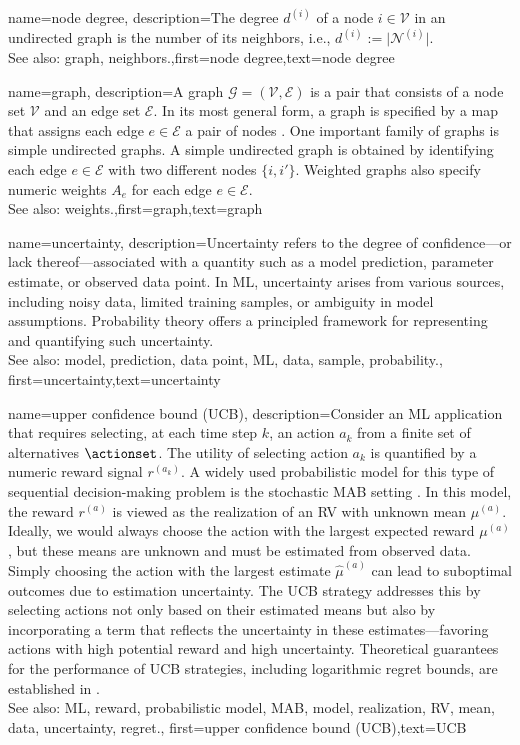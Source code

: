 {name={node degree},
	description={The degree $d^{(i)}$ of a node $i \in \mathcal{V}$ 
		in an undirected graph is the number of its neighbors, i.e., $d^{(i)} := \big|\mathcal{N}^{(i)}\big|$.
					\\ 
		See also: graph, neighbors.},first={node degree},text={node degree} 
}

{name={graph},
	description={A graph $\mathcal{G} = \left( \mathcal{V},\mathcal{E} \right)$ is a pair that consists of 
		a node set $\mathcal{V}$ and an edge set $\mathcal{E}$. In its most general form, a graph is 
		specified by a map that assigns each edge $e \in \mathcal{E}$ a pair of nodes \cite{RockNetworks}. 
		One important family of graphs is simple undirected graphs. A simple undirected graph 
		is obtained by identifying each edge $e \in \mathcal{E}$ with two different nodes $\{i,i'\}$. 
		Weighted graphs also specify numeric weights $A_{e}$ for each 
		edge $e \in \mathcal{E}$.
					\\ 
		See also: weights.},first={graph},text={graph} 
}

{name={uncertainty},
	description={Uncertainty refers to the degree of confidence—or 
		lack thereof—associated with a quantity such as a model prediction, parameter estimate, or 
		observed data point. In ML, uncertainty arises from various sources, including 
		noisy data, limited training samples, or ambiguity in model assumptions. Probability theory 
		offers a principled framework for representing and quantifying such uncertainty.
					\\ 
		See also: model, prediction, data point, ML, data, sample, probability.},
	first={uncertainty},text={uncertainty}
}

{name={upper confidence bound (UCB)},
	description={Consider an ML 
		application that requires selecting, at each time step $k$, an action $a_{k}$ 
		from a finite set of alternatives $\actionset$. The utility of selecting action $a_{k}$ 
		is quantified by a numeric reward signal $r^{(a_{k})}$. 
		A widely used probabilistic model for this type of sequential decision-making problem 
		is the stochastic MAB setting \cite{Bubeck2012}. In this model, 
		the reward $r^{(a)}$ is viewed as the realization of an RV 
		with unknown mean $\mu^{(a)}$. Ideally, we would always choose the 
		action with the largest expected reward $\mu^{(a)}$, but these 
		means are unknown and must be estimated from observed data. Simply 
		choosing the action with the largest estimate $\widehat{\mu}^{(a)}$ can 
		lead to suboptimal outcomes due to estimation uncertainty. The UCB strategy 
		addresses this by selecting actions not only based on their estimated means but 
		also by incorporating a term that reflects the uncertainty in these estimates—favoring 
		actions with high potential reward and high uncertainty. Theoretical guarantees 
		for the performance of UCB strategies, including logarithmic regret bounds, are established in \cite{Bubeck2012}.
					\\ 
		See also: ML, reward, probabilistic model, MAB, model, realization, RV, mean, data, uncertainty, regret.},
	first={upper confidence bound (UCB)},text={UCB} 
}

